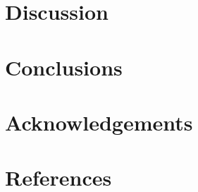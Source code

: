 \documentclass[
]{article}
\begin{document}
\hypertarget{discussion}{%
\section{Discussion}\label{discussion}}

\hypertarget{conclusions}{%
\section{Conclusions}\label{conclusions}}

\hypertarget{acknowledgements}{%
\section{Acknowledgements}\label{acknowledgements}}

\hypertarget{references}{%
\section*{References}\label{references}}
\end{document}
